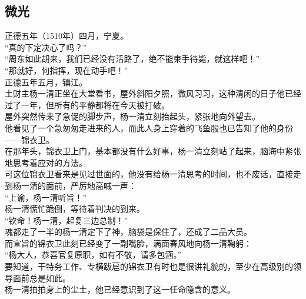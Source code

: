 \begin{multicols}{\theparacolNo}
\subsection{微光}
正德五年（1510年）四月，宁夏。\\

“真的下定决心了吗？”\\

“周东如此胡来，我们已经没有活路了，绝不能束手待毙，就这样吧！”\\

“那就好，何指挥，现在动手吧！”\\

正德五年五月，镇江。\\

土财主杨一清正坐在大堂看书，屋外斜阳夕照，微风习习，这种清闲的日子他已经过了一年，但所有的平静都将在今天被打破。\\

屋外突然传来了急促的脚步声，杨一清立刻抬起头，紧张地向外望去。\\

他看见了一个急匆匆走进来的人，而此人身上穿着的飞鱼服也已告知了他的身份——锦衣卫。\\

在那年头，锦衣卫上门，基本都没有什么好事，杨一清立刻站了起来，脑海中紧张地思考着应对的方法。\\

可这位锦衣卫看来是见过世面的，他没有给杨一清思考的时间，也不废话，直接走到杨一清的面前，严厉地高喊一声：\\

“上谕，杨一清听旨！”\\

杨一清慌忙跪倒，等待着判决的到来。\\

“钦命！杨一清，起复三边总制！”\\

魂都走了一半的杨一清定下了神，脑袋是保住了，还成了二品大员。\\

而宣旨的锦衣卫此刻已经变了一副嘴脸，满面春风地向杨一清鞠躬：\\

“杨大人，恭喜官复原职，如有不敬，请多包涵。”\\

要知道，干特务工作、专横跋扈的锦衣卫有时也是很讲礼貌的，至少在高级别的领导面前总是如此。\\

杨一清拍拍身上的尘土，他已经意识到了这一任命隐含的意义。\\


\end{multicols}
